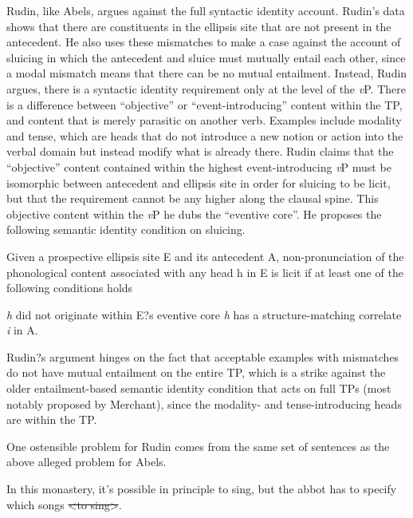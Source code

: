 \documentclass{turabian-researchpaper}
\begin{document}
Rudin, like Abels, argues against the full syntactic identity account. Rudin's data shows that there are constituents in the ellipsis site that are not present in the antecedent. He also uses these mismatches to make a case against the account of sluicing in which the antecedent and sluice must mutually entail each other, since a modal mismatch means that there can be no mutual entailment. Instead, Rudin argues, there is a syntactic identity requirement only at the level of the \textit{v}P. There is a difference between ``objective'' or ``event-introducing'' content within the TP, and content that is merely parasitic on another verb. Examples include modality and tense, which are heads that do not introduce a new notion or action into the verbal domain but instead modify what is already there. Rudin claims that the ``objective'' content contained within the highest event-introducing \textit{v}P must be isomorphic between antecedent and ellipsis site in order for sluicing to be licit, but that the requirement cannot be any higher along the clausal spine. This objective content within the \textit{v}P he dubs the ``eventive core''. He proposes the following semantic identity condition on sluicing. 

\begin{exe} 
\ex\label{rudinidcond}
Given a prospective ellipsis site E and its antecedent A, non-pronunciation of the phonological content associated with any head h in E is licit if at least one of the following conditions holds
\begin{xlist} 
\ex \textit{h} did not originate within E?s eventive core
\ex \textit{h} has a structure-matching correlate \textit{i} in A. 
\end{xlist}
\end{exe}

Rudin?s argument hinges on the fact that acceptable examples with mismatches do not have mutual entailment on the entire TP, which is a strike against the older entailment-based semantic identity condition that acts on full TPs (most notably proposed by Merchant), since the modality- and tense-introducing heads are within the TP. 

One ostensible problem for Rudin comes from the same set of sentences as the above alleged problem for Abels. 

\begin{exe}
\ex\label{f*ckingmonks} 
\begin{xlist}
\ex \label{f*ckingmonks2} In this monastery, it's possible in principle to sing, but the abbot has to specify which songs \sout{\textless to sing\textgreater}.
\end{xlist}
\end{exe}
\end{document}
